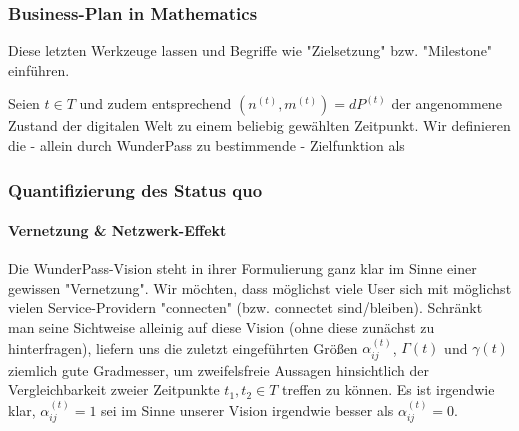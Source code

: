 \vspace{1cm}











\vspace{1cm}

\vspace{1cm}


\subsubsection{Business-Plan in Mathematics}
\label{sec:eco_zahlen_business_plan}

Diese letzten Werkzeuge lassen und Begriffe wie "Zielsetzung" bzw. "Milestone" einführen.

\vspace{0.3cm}

\begin{Def}\label{defZiel}

Seien $t \in T$ und zudem entsprechend $(n^{(t)}, m^{(t)}) = dP^{(t)}$ der angenommene Zustand der digitalen Welt zu einem beliebig gewählten Zeitpunkt. Wir definieren die - allein durch WunderPass zu bestimmende - Zielfunktion als

\end{Def}


\subsubsection{Quantifizierung des Status quo}
\label{sec:eco_zahlen_status_quo}



\paragraph{Vernetzung \& Netzwerk-Effekt}
\label{sec:zahlen_status_quo_netzwerk_effekt}

\textrm{ }
\vspace{0.3cm}

Die WunderPass-Vision steht in ihrer Formulierung ganz klar im Sinne einer gewissen "Vernetzung". Wir möchten, dass möglichst viele User sich mit möglichst vielen Service-Providern "connecten" (bzw. connectet sind/bleiben). Schränkt man seine Sichtweise alleinig auf diese Vision (ohne diese zunächst zu hinterfragen), liefern uns die zuletzt eingeführten Größen $\alpha^{(t)}_{ij}$, $\Gamma(t)$ und $\gamma(t)$ ziemlich gute Gradmesser, um zweifelsfreie Aussagen hinsichtlich der Vergleichbarkeit zweier Zeitpunkte $t_1, t_2 \in T$ treffen zu können. Es ist irgendwie klar, $\alpha^{(t)}_{ij} = 1$ sei im Sinne unserer Vision irgendwie besser als $\alpha^{(t)}_{ij} = 0$.

